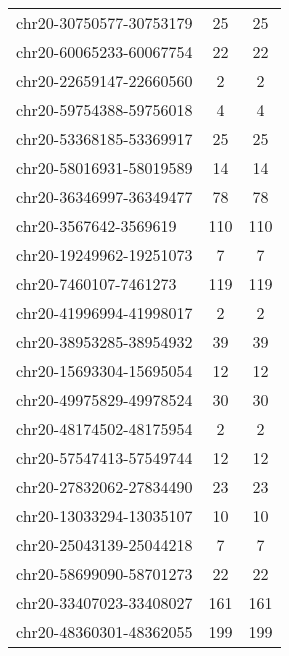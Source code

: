 \begin{longtable}{lSS}
	chr20-30750577-30753179 & 25     & 25                                        \\
	chr20-60065233-60067754 & 22     & 22                                        \\
	chr20-22659147-22660560 & 2      & 2                                         \\
	chr20-59754388-59756018 & 4      & 4                                         \\
	chr20-53368185-53369917 & 25     & 25                                        \\
	chr20-58016931-58019589 & 14     & 14                                        \\
	chr20-36346997-36349477 & 78     & 78                                        \\
	chr20-3567642-3569619   & 110    & 110                                       \\
	chr20-19249962-19251073 & 7      & 7                                         \\
	chr20-7460107-7461273   & 119    & 119                                       \\
	chr20-41996994-41998017 & 2      & 2                                         \\
	chr20-38953285-38954932 & 39     & 39                                        \\
	chr20-15693304-15695054 & 12     & 12                                        \\
	chr20-49975829-49978524 & 30     & 30                                        \\
	chr20-48174502-48175954 & 2      & 2                                         \\
	chr20-57547413-57549744 & 12     & 12                                        \\
	chr20-27832062-27834490 & 23     & 23                                        \\
	chr20-13033294-13035107 & 10     & 10                                        \\
	chr20-25043139-25044218 & 7      & 7                                         \\
	chr20-58699090-58701273 & 22     & 22                                        \\
	chr20-33407023-33408027 & 161    & 161                                       \\
	chr20-48360301-48362055 & 199    & 199                                       \\

\end{longtable}
